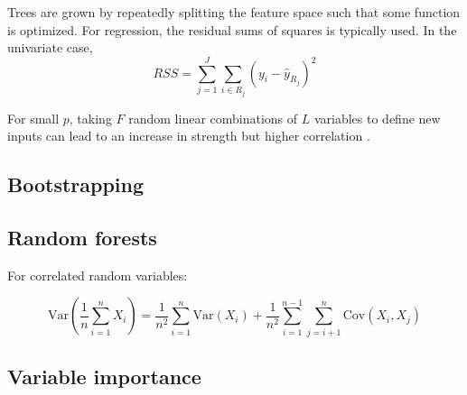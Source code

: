 Trees are grown by repeatedly splitting the feature space such that some function is optimized. For regression, the residual sums of squares is typically used. In the univariate case,
\[ RSS=\sum_{j=1}^J\sum_{i\in R_j}(y_i - \hat{y}_{R_j})^2 \]

For small $p$, taking $F$ random linear combinations of $L$ variables to define new inputs can lead to an increase in strength but higher correlation \citep{breiman:2001}. \cite{segal:2011} \cite{death:2002}

\subsection{Bootstrapping}


\subsection{Random forests}

For correlated random variables:

\[ \mathrm{Var}\left(\frac{1}{n}\sum_{i=1}^nX_i\right) = \frac{1}{n^2}\sum_{i=1}^n\mathrm{Var}(X_i) + \frac{1}{n^2}\sum_{i=1}^{n-1}\sum_{j=i+1}^n\mathrm{Cov}(X_i,X_j) \]


\subsection{Variable importance}

